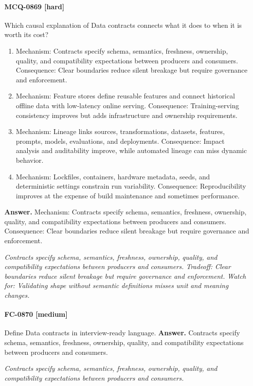 \paragraph{MCQ-0869 [hard]} Which causal explanation of Data contracts connects what it does to when it is worth its cost?
\begin{enumerate}[label=\Alph*.]
\item Mechanism: Contracts specify schema, semantics, freshness, ownership, quality, and compatibility expectations between producers and consumers. Consequence: Clear boundaries reduce silent breakage but require governance and enforcement.
\item Mechanism: Feature stores define reusable features and connect historical offline data with low-latency online serving. Consequence: Training-serving consistency improves but adds infrastructure and ownership requirements.
\item Mechanism: Lineage links sources, transformations, datasets, features, prompts, models, evaluations, and deployments. Consequence: Impact analysis and auditability improve, while automated lineage can miss dynamic behavior.
\item Mechanism: Lockfiles, containers, hardware metadata, seeds, and deterministic settings constrain run variability. Consequence: Reproducibility improves at the expense of build maintenance and sometimes performance.
\end{enumerate}
\noindent\textbf{Answer.} Mechanism: Contracts specify schema, semantics, freshness, ownership, quality, and compatibility expectations between producers and consumers. Consequence: Clear boundaries reduce silent breakage but require governance and enforcement.
\par\textit{Contracts specify schema, semantics, freshness, ownership, quality, and compatibility expectations between producers and consumers. Tradeoff: Clear boundaries reduce silent breakage but require governance and enforcement. Watch for: Validating shape without semantic definitions misses unit and meaning changes.}
\paragraph{FC-0870 [medium]} Define Data contracts in interview-ready language.
\noindent\textbf{Answer.} Contracts specify schema, semantics, freshness, ownership, quality, and compatibility expectations between producers and consumers.
\par\textit{Contracts specify schema, semantics, freshness, ownership, quality, and compatibility expectations between producers and consumers.}
